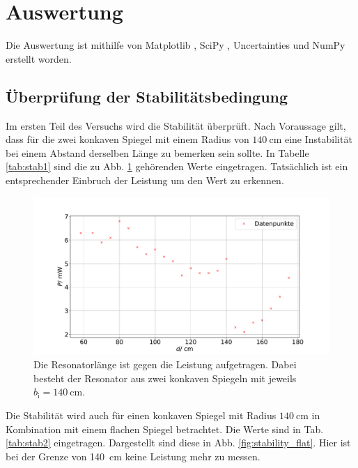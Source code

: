 \section{Auswertung}
\label{sec:Auswertung}
Die Auswertung ist mithilfe von Matplotlib \cite{matplotlib}, SciPy \cite{scipy}, Uncertainties \cite{uncertainties} und NumPy \cite{numpy} erstellt worden.

\subsection{Überprüfung der Stabilitätsbedingung}

Im ersten Teil des Versuchs wird die Stabilität überprüft. Nach Voraussage gilt, dass für die zwei konkaven Spiegel mit einem Radius von $\SI{140}{\centi\meter}$ eine Instabilität bei einem Abstand derselben Länge zu bemerken sein sollte. 
In Tabelle \ref{tab:stab1} sind die zu Abb. \ref{fig:stability140} gehörenden Werte eingetragen.
Tatsächlich ist ein entsprechender Einbruch der Leistung um den Wert zu erkennen. %



\begin{figure}
    \centering
    \includegraphics[width=\textwidth]{plots/stability140.pdf}
    \caption{Die Resonatorlänge ist gegen die Leistung aufgetragen. Dabei besteht der Resonator aus zwei konkaven Spiegeln mit jeweils $b_\text{i} = \SI{140}{\centi\meter}$.}
    \label{fig:stability140}
\end{figure} 

Die Stabilität wird auch für einen konkaven Spiegel mit Radius $\SI{140}{\centi\meter}$ in Kombination mit einem flachen Spiegel betrachtet. Die Werte sind in Tab. \ref{tab:stab2} eingetragen. Dargestellt sind diese in Abb. \ref{fig:stability_flat}.
Hier ist bei der Grenze von \SI{140}{\centi\meter} keine Leistung mehr zu messen.

